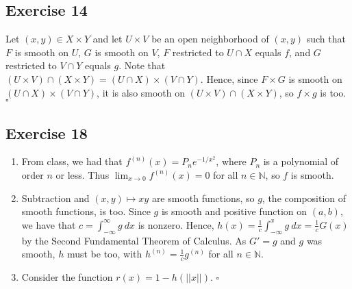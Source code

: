 \documentclass{article}
\begin{document}
\subsection*{Exercise 14}
Let $(x,y) \in X \times Y$ and let $U \times V$ be an open neighborhood of $(x,y)$ such that
$F$ is smooth on $U$, $G$ is smooth on $V$, $F$ restricted to $U \cap X$ equals $f$, and
$G$ restricted to $V \cap Y$ equals $g$. Note that
$(U \times V)\cap(X\times Y)=(U \cap X) \times (V \cap Y)$. Hence, since
$F\times G$ is smooth on
$(U \cap X) \times (V \cap Y)$, it is also smooth on 
$(U \times V)\cap(X\times Y)$, so $f \times g$ is too.
\hfill $\square$

\subsection*{Exercise 18}
\begin{enumerate}[label=\textbf{\alph*}]
\item{
	From class, we had that $f^{(n)}(x) = P_n e^{-1/{x^2}}$, where $P_n$ is a polynomial of order
	$n$ or less. Thus $\lim_{x \to 0} f^{(n)}(x) = 0$ for all $n \in \mathbb{N}$, so $f$ is smooth.
}
\item{
	Subtraction and $(x,y) \mapsto xy$ are smooth functions, so $g$, the composition of smooth functions,
	 is too. Since $g$ is smooth and positive function on $(a,b)$,
	we have that $c=\int_{-\infty}^{\infty}g\ dx$ is nonzero. Hence,
	$h(x) =\frac{1}{c}\int_{-\infty}^{x}g\ dx = \frac{1}{c}G(x)$ by the Second Fundamental Theorem of Calculus.
	As $G' = g$ and $g$ was smooth, $h$ must be too, with $h^{(n)} = \frac{1}{c}g^{(n)}$ for all $n \in \mathbb{N}$.
}
\item{
	Consider the function $r(x)=1-h(\vert\vert x\vert\vert)$.
}
\hfill $\square$
\end{enumerate}
\end{document}
